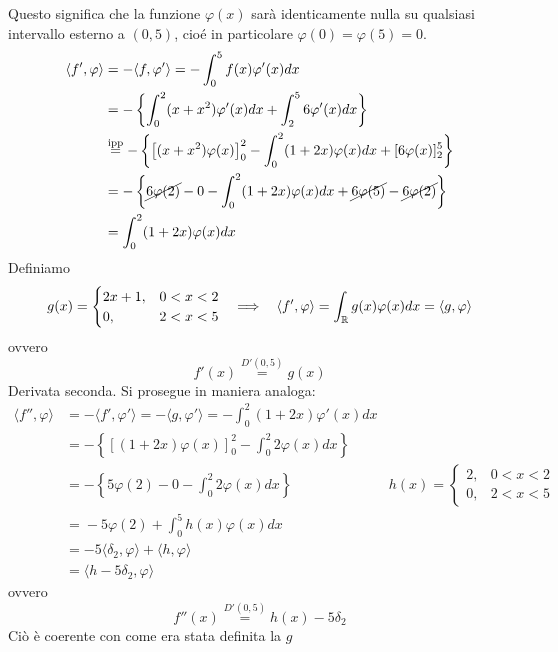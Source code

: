 Questo significa che la funzione $\varphi (x)$ sarà identicamente nulla su qualsiasi intervallo esterno a $(0,5)$, cioé in particolare $\varphi ( 0) =\varphi ( 5) =0$.
\begin{align*}
\langle f',\varphi \rangle  & =-\langle f,\varphi '\rangle =-\int ^{5}_{0} f(x)\varphi '(x)dx\\
 & =-\left\{\int ^{2}_{0} (x+x^{2} )\varphi '(x)dx+\int ^{5}_{2} 6\varphi '(x)dx\right\}\\
 & \overset{\text{ipp}}{=} -\left\{\left[ (x+x^{2} )\varphi (x)\right]^{2}_{0} -\int ^{2}_{0} (1+2x)\varphi (x)dx+[ 6\varphi (x)]^{5}_{2}\right\}\\
 & =-\left\{\cancel{6\varphi ( 2)} -0-\int ^{2}_{0}( 1+2x) \varphi ( x) dx+\cancel{6\varphi ( 5)} -\cancel{6\varphi ( 2)}\right\}\\
 & =\int ^{2}_{0}( 1+2x) \varphi ( x) dx
\end{align*}
Definiamo
\begin{equation*}
g(x)=\begin{cases}
2x+1, & 0< x< 2\\
0, & 2< x< 5
\end{cases} \ \ \implies \ \ \langle f',\varphi \rangle =\int _{\mathbb{R} } g( x) \varphi ( x) dx=\langle g,\varphi \rangle 
\end{equation*}
ovvero
\begin{equation*}
f'(x)\overset{D'( 0,5)}{=} g(x)
\end{equation*}
Derivata seconda. Si prosegue in maniera analoga:
\begin{equation*}
\begin{aligned}
\langle f'',\varphi \rangle  & =-\langle f',\varphi '\rangle =-\langle g,\varphi '\rangle =-\int ^{2}_{0} (1+2x)\varphi '(x)dx & \\
 & =-\left\{[ (1+2x)\varphi (x)]^{2}_{0} -\int ^{2}_{0} 2\varphi (x)dx\right\} & \\
 & =-\left\{5\varphi (2)-0-\int ^{2}_{0} 2\varphi (x)dx\right\} & h(x)=\begin{cases}
2, & 0< x< 2\\
0, & 2< x< 5
\end{cases}\\
 & \overset{}{=} -5\varphi (2)+\int ^{5}_{0} h(x)\varphi (x)dx & \\
 & =-5\langle \delta _{2} ,\varphi \rangle +\langle h,\varphi \rangle  & \\
 & =\langle h-5\delta _{2} ,\varphi \rangle  & 
\end{aligned}
\end{equation*}
ovvero
\begin{equation*}
f''(x)\overset{D'( 0,5)}{=} h(x)-5\delta _{2}
\end{equation*}
Ciò è coerente con come era stata definita la $g$


